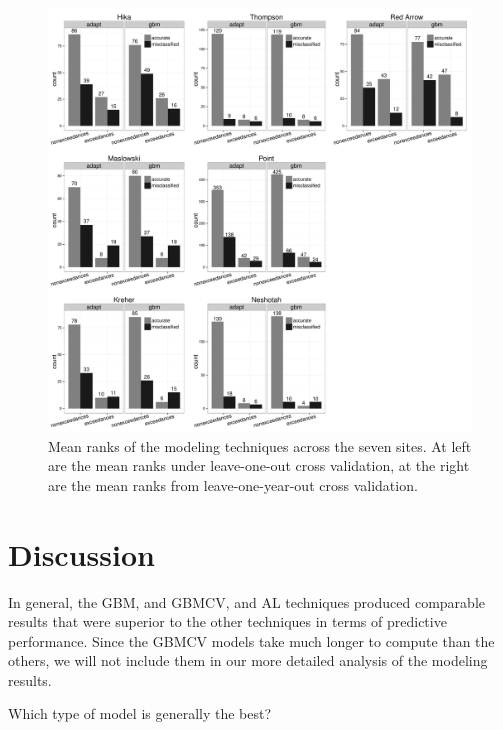 \documentclass[english]{article}\usepackage[]{graphicx}\usepackage[]{color}
\makeatletter
\def\maxwidth{ %
  \ifdim\Gin@nat@width>\linewidth
    \linewidth
  \else
    \Gin@nat@width
  \fi
}
\newenvironment{knitrout}{}{} %
\numberwithin{equation}{section}
\numberwithin{figure}{section}
\renewcommand\[{\begin{equation}}
\renewcommand\]{\end{equation}}
\makeatother
\begin{document}
\begin{knitrout}
\color{fgcolor}\begin{figure}[]

\includegraphics[width=\maxwidth]{figure/counts-barcharts} \caption[Mean ranks of the modeling techniques across the seven sites]{Mean ranks of the modeling techniques across the seven sites. At left are the mean ranks under leave-one-out cross validation, at the right are the mean ranks from leave-one-year-out cross validation.\label{fig:counts-barcharts}}
\end{figure}


\end{knitrout}


\section{Discussion}

In general, the GBM, and GBMCV, and AL techniques produced comparable
results that were superior to the other techniques in terms of predictive
performance. Since the GBMCV models take much longer to compute than
the others, we will not include them in our more detailed analysis
of the modeling results.

Which type of model is generally the best?
\end{document}
